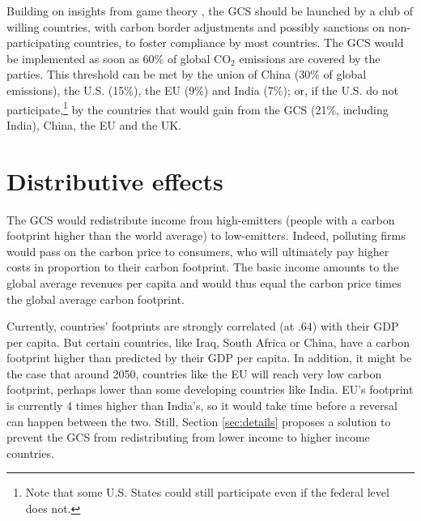 \documentclass[12pt,english]{article}
\begin{document}
Building on insights from game theory \citep{mackay_price_2015, nordhaus_climate_2015}, the GCS should be launched by a club of willing countries, with carbon border adjustments and possibly sanctions on non-participating countries, to foster compliance by most countries. 
The GCS would be implemented as soon as 60\% of global CO$_\text{2}$ emissions are covered by the parties. This threshold can be met by the union of China (30\% of global emissions), the U.S. (15\%), the EU (9\%) and India (7\%); or, if the U.S. do not participate,\footnote{Note that some U.S. States could still participate even if the federal level does not.} by the countries that would gain from the GCS (21\%, including India), China, the EU and the UK.

% 



\section{Distributive effects}\label{sec:distribution}

The GCS would redistribute income from high-emitters (people with a carbon footprint higher than the world average) to low-emitters. Indeed, polluting firms would pass on the carbon price to consumers, who will ultimately pay higher costs in proportion to their carbon footprint. The basic income amounts to the global average revenues per capita and would thus equal the carbon price times the global average carbon footprint. 

Currently, countries' footprints are strongly correlated (at .64) with their GDP per capita. But certain countries, like Iraq, South Africa or China, have a carbon footprint higher than predicted by their GDP per capita. In addition, it might be the case that around 2050, countries like the EU will reach very low carbon footprint, perhaps lower than some developing countries like India. EU's footprint is currently 4 times higher than India's, so it would take time before a reversal can happen between the two. Still, Section \ref{sec:details} proposes a solution to prevent the GCS from redistributing from lower income to higher income countries.
\end{document}
